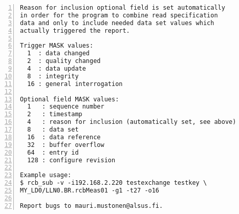 \begin{lstlisting}[caption={rcb\_sub-ohjelman aputeksti.},label={lst:json-rakenne}, numbers=left]
Reason for inclusion optional field is set automatically
in order for the program to combine read specification
data and only to include needed data set values which
actually triggered the report.

Trigger MASK values:
  1  : data changed
  2  : quality changed
  4  : data update
  8  : integrity
  16 : general interrogation

Optional field MASK values:
  1   : sequence number
  2   : timestamp
  4   : reason for inclusion (automatically set, see above)
  8   : data set
  16  : data reference
  32  : buffer overflow
  64  : entry id
  128 : configure revision

Example usage:
$ rcb_sub -v -i192.168.2.220 testexchange testkey \
MY_LD0/LLN0.BR.rcbMeas01 -g1 -t27 -o16

Report bugs to mauri.mustonen@alsus.fi.
\end{lstlisting}